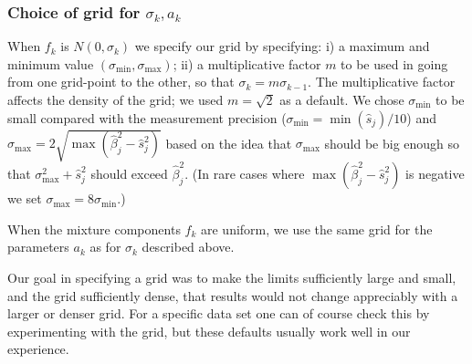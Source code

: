 \documentclass[11pt]{article}
\def\bhat{\hat{\beta}}
\def\shat{\hat{s}}
\begin{document}
\subsubsection*{Choice of grid for $\sigma_k, a_k$} \label{sec:grid}

\def\sigmamax{\sigma_{\text{max}}}
\def\sigmamin{\sigma_{\text{min}}}
When $f_k$ is $N(0,\sigma_k)$ we specify our grid by specifying: i) a maximum and minimum value $(\sigmamin,\sigmamax)$; ii) a multiplicative factor $m$ to be used
in going from one grid-point to the other, so that $\sigma_{k} = m \sigma_{k-1}$. The multiplicative factor affects the density of the grid; we used $m=\sqrt{2}$
as a default. We chose $\sigmamin$ to be small compared with the measurement precision ($\sigmamin=\min(\shat_j)/10$) and $\sigmamax= 2\sqrt{\max(\bhat_j^2-\shat_j^2)}$
based on the idea that $\sigmamax$ should be big enough so that  $\sigmamax^2 + \shat_j^2$ should exceed $\bhat_j^2$.   (In rare cases where $\max(\bhat_j^2-\shat_j^2)$
is negative we set $\sigmamax = 8\sigmamin$.)

When the mixture components $f_k$ are uniform, we use the same grid for the parameters $a_k$ as for $\sigma_k$ described above.

Our goal in specifying a grid was to make the limits sufficiently large and small, and the grid sufficiently dense, that results would not change appreciably with 
a larger or denser grid. For a specific data set one can of course check this by experimenting with the grid, but these defaults usually work well in our experience.


\appendix
\end{document}
